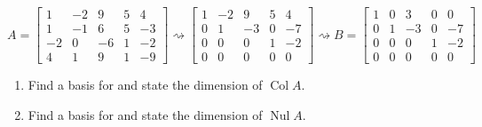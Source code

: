 \documentclass[letter,11pt]{article}
\begin{document}
$$
A=\begin{bmatrix}
1 & -2 & 9 & 5 & 4 \\
1 & -1 & 6 & 5 & -3 \\
-2 & 0 & -6 & 1 & -2 \\
4 & 1 & 9 & 1 & -9
\end{bmatrix} \rightsquigarrow
\begin{bmatrix}
1 & -2 & 9 & 5 & 4 \\
0 & 1 & -3 & 0 & -7 \\
0 & 0 & 0 & 1 & -2 \\
0 & 0 & 0 & 0 & 0
\end{bmatrix} \rightsquigarrow B=
\begin{bmatrix}
1 & 0 & 3 & 0 & 0 \\
0 & 1 & -3 & 0 & -7 \\
0 & 0 & 0 & 1 & -2 \\
0 & 0 & 0 & 0 & 0
\end{bmatrix}
$$
\begin{enumerate}[label = \roman*.]
    \item Find a basis for and state the dimension of $\operatorname{Col} A$.
    \item Find a basis for and state the dimension of $\operatorname{Nul} A$.
\end{enumerate}
\end{document}
